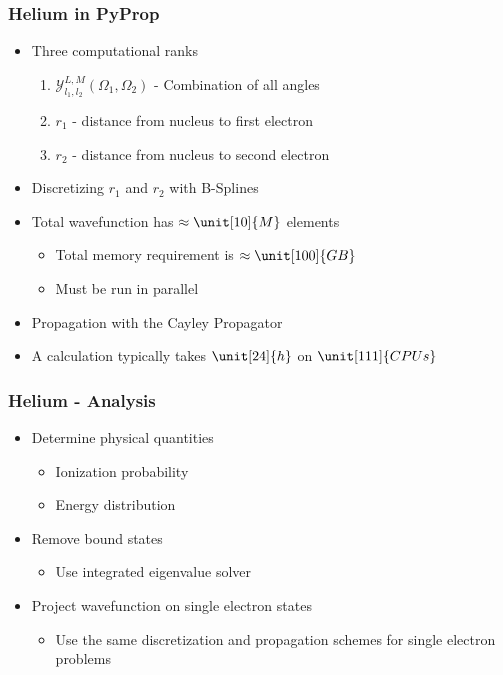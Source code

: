 \documentclass{beamer}
\begin{document}
\begin{frame}
	\frametitle{Helium in PyProp}

	\begin{itemize}
		\item<1-> Three computational ranks
			\begin{enumerate}
				\item $\mathcal{Y}_{l_1,l_2}^{L,M}(\Omega_1, \Omega_2)$ - Combination of all angles
				\item $r_1$ - distance from nucleus to first electron 
				\item $r_2$ - distance from nucleus to second electron 
			\end{enumerate}
		\item<2-> Discretizing $r_1$ and $r_2$ with B-Splines 
		\item<3-> Total wavefunction has $\approx \unit[10]{M}$ elements
			\begin{itemize}
				\item Total memory requirement is $\approx \unit[100]{GB}$
				\item Must be run in parallel 
			\end{itemize}
		\item<4-> Propagation with the Cayley Propagator
		\item<5-> A calculation typically takes $\unit[24]{h}$ on $\unit[111]{CPUs}$
	\end{itemize}
\end{frame}


\begin{frame}
	\frametitle{Helium - Analysis}
	
	\begin{itemize}
		\item<2-> Determine physical quantities
			\begin{itemize}
				\item Ionization probability
				\item Energy distribution
			\end{itemize}
		\item<3-> Remove bound states
			\begin{itemize}
				\item Use integrated eigenvalue solver 
			\end{itemize}
		\item<4-> Project wavefunction on single electron states
			\begin{itemize}
				\item Use the same discretization and propagation schemes for single electron problems
			\end{itemize}
	\end{itemize}
\end{frame}
\end{document}
